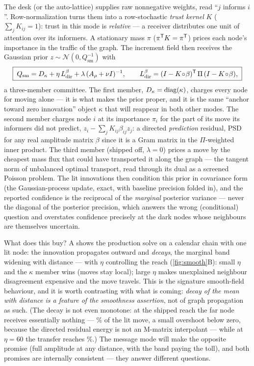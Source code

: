 \documentclass[11pt]{article}
\newcommand{\Qsm}{Q_{\mathrm{sm}}}
\newcommand{\Ldir}{L_{\mathrm{dir}}}
\newcommand{\Arho}{A_{\rho}}
\begin{document}
The desk (or the auto-lattice) supplies raw nonnegative weights, read
``$j$ informs $i$''.  Row-normalization turns them into a row-stochastic
\emph{trust kernel} $K$ ($\sum_jK_{ij}=1$): trust in this mode is
\emph{relative} --- a receiver distributes one unit of attention over its
informers.  A stationary mass $\pi$ ($\pi^{\mathsf{T}} K=\pi^{\mathsf{T}}$) prices each node's
importance in the traffic of the graph.  The increment field then receives
the Gaussian prior $z\sim\mathcal N(0,\Qsm^{-1})$ with
\begin{equation}
\boxed{\;\Qsm=D_\kappa+\eta\,\Ldir^{\beta}+\lambda\,(\Arho+\nu I)^{-1},
\qquad
\Ldir^{\beta}=(I-K\!\circ\!\beta)\T\,\Pi\,(I-K\!\circ\!\beta),\;}
\label{eq:qsm}
\end{equation}
a three-member committee.  The first member, $D_\kappa=\operatorname{diag}(\kappa)$,
charges every node for moving alone --- it is what makes the prior proper,
and it is the same ``anchor toward zero innovation'' object $\kappa$ that
will reappear in both other modes.  The second member charges node $i$ at
its importance $\pi_i$ for the part of its move its informers did not
predict, $z_i-\sum_jK_{ij}\beta_{ij}z_j$: a directed \emph{prediction}
residual, PSD for any real amplitude matrix $\beta$ since it is a Gram
matrix in the $\Pi$-weighted inner product.  The third member (shipped
off, $\lambda=0$) prices a move by the cheapest mass flux that could have
transported it along the graph --- the tangent norm of unbalanced optimal
transport, read through its dual as a screened Poisson problem.  The lit
innovations then condition this prior in covariance form (the
Gaussian-process update, exact, with baseline precision folded in), and
the reported confidence is the reciprocal of the \emph{marginal} posterior
variance --- never the diagonal of the posterior precision, which answers
the wrong (conditional) question and overstates confidence precisely at
the dark nodes whose neighbours are themselves uncertain.

What does this buy?  A shows the production solve on a
calendar chain with one lit node: the innovation propagates outward and
\emph{decays}, the marginal band widening with distance --- with
$\eta$ controlling the reach (\cref{fig:smooth}B): small $\eta$ and the
$\kappa$ member wins (moves stay local); large $\eta$ makes unexplained
neighbour disagreement expensive and the move travels.  This is the
signature smooth-field behaviour, and it is worth contrasting with what is
coming: \emph{decay of the mean with distance is a feature of the
smoothness assertion}, not of graph propagation as such.  (The decay is
not even monotone: at the shipped reach the far node receives essentially
nothing --- \gtpsmoothfar\% of the lit move, a small overshoot below zero,
because the directed residual energy is not an M-matrix interpolant ---
while at $\eta=60$ the transfer reaches \gtpsmoothfarsixty\%.)  The message mode
will make the opposite promise (full amplitude at any distance, with the
band paying the toll), and both promises are internally consistent ---
they answer different questions.
\end{document}
